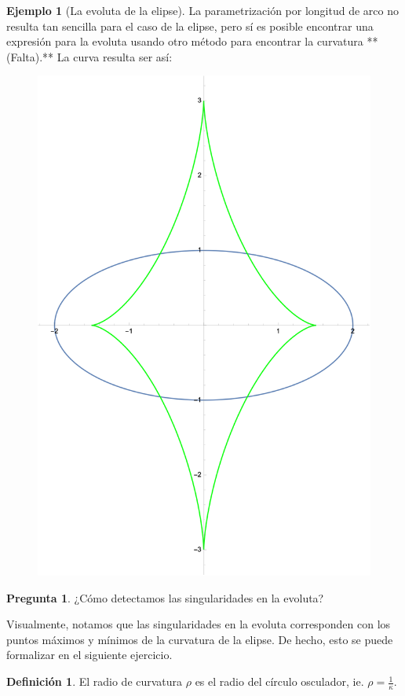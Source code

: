 \documentclass[spanish]{book}
\theoremstyle{definition}
\newtheorem*{defn}{Definición}
\newtheorem*{ejem}{Ejemplo}
\newtheorem*{pregunta}{Pregunta}
\begin{document}
\begin{ejem}[La evoluta de la elipse]
	La parametrización por longitud de arco no resulta tan sencilla para el caso de la elipse, pero sí es posible encontrar una expresión para la evoluta usando otro método para encontrar la curvatura **(Falta).**
	La curva resulta ser así:
	\begin{figure}[H]
		\centering
		\includegraphics[width=0.7\linewidth]{curvas4}
	\end{figure}
\end{ejem}
\begin{pregunta}
	¿Cómo detectamos las singularidades en la evoluta?
\end{pregunta}
Visualmente, notamos que las singularidades en la evoluta corresponden con los puntos máximos y mínimos de la curvatura de la elipse. De hecho, esto se puede formalizar en el siguiente ejercicio.
\begin{defn}
	El radio de curvatura $\rho$ es el radio del círculo osculador, ie. $\rho=\frac{1}{\kappa}$.
\end{defn}
\end{document}
